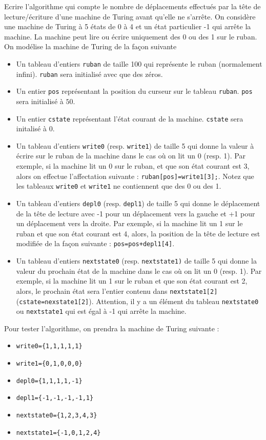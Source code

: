 \exercice {} 
Ecrire l'algorithme qui compte le nombre de déplacements effectués par
la tête de lecture/écriture d'une
machine de Turing avant qu'elle ne s'arrête. On considère une machine
de Turing à 5 états de 0 à 4 et un état particulier -1 qui arrête la
machine.
La machine peut lire ou écrire uniquement des 0 ou des 1 sur le ruban.
On modélise la machine de
Turing de la façon suivante
\begin{itemize}
\item Un tableau d'entiers \texttt{ruban} de taille 100 qui représente le ruban
  (normalement infini). \texttt{ruban} sera
  initialisé avec que des zéros.
\item Un entier \texttt{pos} représentant la position du curseur sur le
tableau \texttt{ruban}. \texttt{pos} sera initialisé à $50$.
\item Un entier \texttt{cstate} représentant l'état courant de la
  machine. \texttt{cstate} sera initalisé à 0.
\item Un tableau d'entiers \texttt{write0} (resp. \texttt{write1}) de taille 5
  qui donne la valeur à écrire sur le ruban de la machine dans le cas
  où on lit un 0 (resp. 1). Par exemple, si la machine lit un 0 sur le
  ruban, et que son état courant est 3, alors on effectue l'affectation
  suivante : \texttt{ruban[pos]=write1[3];}. Notez que les tableaux
  \texttt{write0} et \texttt{write1} ne contiennent que des 0 ou des 1.
\item Un tableau d'entiers \texttt{depl0} (resp. \texttt{depl1}) de
  taille 5 qui donne le déplacement de la tête de lecture avec -1 pour
  un déplacement vers la gauche et +1 pour un déplacement vers la
  droite. Par exemple, si la machine lit un 1 sur le ruban et que son
  état courant est 4, alors, la position de la tête de lecture est
  modifiée de la façon suivante : \texttt{pos=pos+depl1[4]}.
\item Un tableau d'entiers  \texttt{nextstate0} (resp.  \texttt{nextstate1)} de taille 5 qui donne
  la valeur du prochain état de la machine dans le cas où on lit un 0
  (resp. 1). Par exemple, si la machine lit un 1 sur le ruban et que
  son état courant est 2, alors, le prochain état sera l'entier
  contenu dans  \texttt{nextstate1[2]} (\texttt{cstate=nexstate1[2]}). Attention, il y a un élément du tableau
  \texttt{nextstate0} ou \texttt{nextstate1} qui est égal à -1 qui
  arrête la machine.\\
\end{itemize}
Pour tester l'algorithme, on prendra la machine de Turing suivante :
\begin{itemize}
\item \texttt{write0=\{1,1,1,1,1\}}
\item \texttt{write1=\{0,1,0,0,0\}}
\item \texttt{depl0=\{1,1,1,1,-1\}}
\item \texttt{depl1=\{-1,-1,-1,-1,1\}}
\item \texttt{nextstate0=\{1,2,3,4,3\}}
\item \texttt{nextstate1=\{-1,0,1,2,4\}}
\end{itemize}

